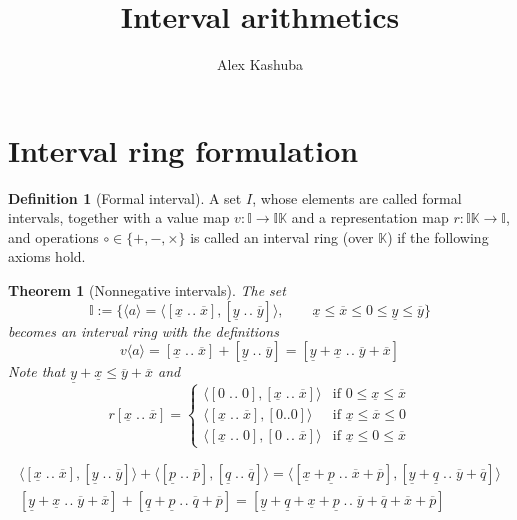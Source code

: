 \documentclass[11pt]{amsart}
\title{Interval arithmetics}
\author{Alex Kashuba}
\DeclareMathOperator{\till}{.\!.}
\begin{document}
\maketitle

\section{Interval ring formulation}

\theoremstyle{definition}
\newtheorem*{defn}{Definition}
\theoremstyle{plain}
\newtheorem*{thm}{Theorem}
  
\begin{defn}[Formal interval]
A set $I$, whose elements are called formal intervals, together with a value map $v : \mathbb{I} \to \mathbb{IK}$ and a representation map $r: \mathbb{IK} \to \mathbb{I}$, and operations $\circ \in \{+,-,\times\}$ is called an interval ring (over $\mathbb{K}$) if the following axioms hold.
\end{defn}

\begin{thm}[Nonnegative intervals]
The set
$$
\mathbb{I} :=\{\langle a \rangle =\langle [\underline{x}\till\overline{x}],[\underline{y}\till\overline{y}] \rangle, \qquad 
\underline{x}\leqslant \overline{x}\leqslant 0 \leqslant\underline{y}\leqslant\overline{y}\}
$$
becomes an interval ring with the definitions
$$
v\langle a \rangle = [\underline{x}\till\overline{x}] + [\underline{y}\till\overline{y}] = 
[\underline{y}+\underline{x}\till \overline{y}+\overline{x}]
$$
Note that $\underline{y}+\underline{x} \leqslant \overline{y}+\overline{x}$
and
$$
r[\underline{x}\till\overline{x}] = 
\begin{cases}
\langle [0\till0],[\underline{x}\till\overline{x}] \rangle & \text{if $0 \leqslant\underline{x}\leqslant\overline{x}$} \\
\langle [\underline{x}\till\overline{x}],[0..0] \rangle & \text{if $\underline{x}\leqslant \overline{x}\leqslant 0$} \\
\langle [\underline{x}\till0],[0\till\overline{x}] \rangle & \text{if $\underline{x}\leqslant 0\leqslant \overline{x}$}
\end{cases}
$$
\end{thm}

\begin{align}
\langle [\underline{x}\till\overline{x}],[\underline{y}\till\overline{y}] \rangle + 
\langle [\underline{p}\till\overline{p}],[\underline{q}\till\overline{q}] \rangle =
\langle [\underline{x}+\underline{p}\till\overline{x}+\overline{p}],[\underline{y}+\underline{q}\till\overline{y}+\overline{q}] \rangle
\\
[\underline{y}+\underline{x}\till \overline{y}+\overline{x}] + 
[\underline{q}+\underline{p}\till\overline{q}+\overline{p}] =
[\underline{y}+\underline{q}+\underline{x}+\underline{p}\till\overline{y}+\overline{q} + \overline{x}+\overline{p}]
\end{align}
\end{document}
